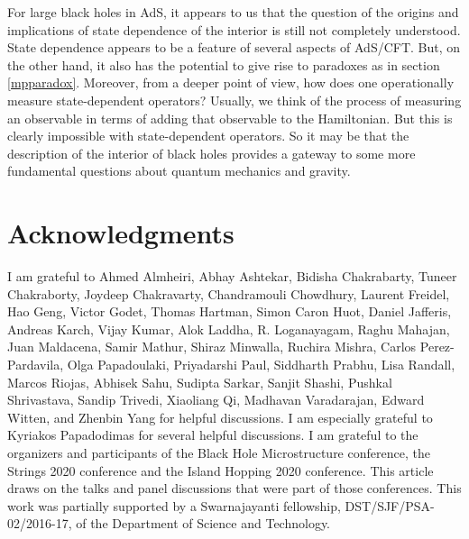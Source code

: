 \documentclass[12pt]{article}
\begin{document}
For large black holes in AdS, it appears to us that the question of
the origins and implications of state dependence of the interior is
still not completely understood. State dependence
appears to be a feature of several aspects of AdS/CFT. But, on the other hand,
it also has the potential to give rise to paradoxes as in section \ref{mpparadox}. Moreover, from a deeper point of view, how does one operationally measure state-dependent operators? Usually, we think of the process of measuring an observable in
terms of adding that observable to the Hamiltonian. But this is clearly impossible with state-dependent operators. So it may be that the description of the interior of black holes provides a gateway to some more fundamental questions about quantum mechanics and gravity.
































\section*{Acknowledgments}
I am grateful to  Ahmed Almheiri, Abhay Ashtekar, Bidisha Chakrabarty, Tuneer Chakraborty, Joydeep Chakravarty, Chandramouli Chowdhury, Laurent Freidel,  Hao Geng,  Victor Godet, Thomas Hartman,  Simon Caron Huot, Daniel Jafferis, Andreas Karch, Vijay Kumar, Alok Laddha, R. Loganayagam, Raghu Mahajan, Juan Maldacena, Samir Mathur, Shiraz Minwalla, Ruchira Mishra,  Carlos Perez-Pardavila, Olga Papadoulaki, Priyadarshi Paul, Siddharth Prabhu, Lisa Randall, Marcos Riojas, Abhisek Sahu, Sudipta Sarkar, Sanjit Shashi, Pushkal Shrivastava, Sandip Trivedi, Xiaoliang Qi,  Madhavan Varadarajan, Edward Witten, and Zhenbin Yang for helpful discussions. I am especially grateful to Kyriakos Papadodimas for several helpful discussions. I am grateful to the organizers and participants of the Black Hole Microstructure conference, the Strings 2020 conference and the Island Hopping 2020 conference. This article draws on the talks and panel discussions that were part of those conferences. This work was partially supported by a Swarnajayanti fellowship,  DST/SJF/PSA-02/2016-17, of the Department of Science and Technology.
\end{document}
